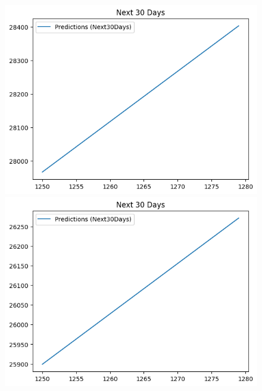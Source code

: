 \begin{figure}[H]
\begin{minipage}{0.15\textwidth}
    \includegraphics[width=1\textwidth]{resources/chapter-5/predicted/EIB_LinearRegression_7-3 30 DAYS.png}
    \end{minipage}
    \hfill
    \begin{minipage}{0.15\textwidth}
    \centering
    \includegraphics[width=1\textwidth]{resources/chapter-5/predicted/EIB_LinearRegression_8-2 30 DAYS.png}
    \end{minipage}
    \hfill
        \begin{minipage}{0.15\textwidth}
    \centering

\end{minipage}
\end{figure}
